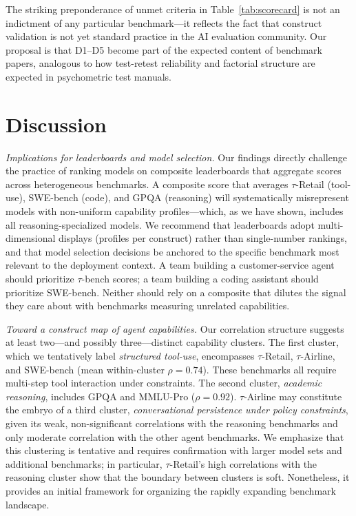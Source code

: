 \documentclass[sigconf]{acmart}
\begin{document}
The striking preponderance of unmet criteria in Table~\ref{tab:scorecard} is not an indictment of any particular benchmark---it reflects the fact that construct validation is not yet standard practice in the AI evaluation community. Our proposal is that D1--D5 become part of the expected content of benchmark papers, analogous to how test-retest reliability and factorial structure are expected in psychometric test manuals.

\section{Discussion}
\textit{Implications for leaderboards and model selection.} Our findings directly challenge the practice of ranking models on composite leaderboards that aggregate scores across heterogeneous benchmarks. A composite score that averages $\tau$-Retail (tool-use), SWE-bench (code), and GPQA (reasoning) will systematically misrepresent models with non-uniform capability profiles---which, as we have shown, includes all reasoning-specialized models. We recommend that leaderboards adopt multi-dimensional displays (profiles per construct) rather than single-number rankings, and that model selection decisions be anchored to the specific benchmark most relevant to the deployment context. A team building a customer-service agent should prioritize $\tau$-bench scores; a team building a coding assistant should prioritize SWE-bench. Neither should rely on a composite that dilutes the signal they care about with benchmarks measuring unrelated capabilities.

\textit{Toward a construct map of agent capabilities.} Our correlation structure suggests at least two---and possibly three---distinct capability clusters. The first cluster, which we tentatively label \emph{structured tool-use}, encompasses $\tau$-Retail, $\tau$-Airline, and SWE-bench (mean within-cluster $\rho = 0.74$). These benchmarks all require multi-step tool interaction under constraints. The second cluster, \emph{academic reasoning}, includes GPQA and MMLU-Pro ($\rho = 0.92$). $\tau$-Airline may constitute the embryo of a third cluster, \emph{conversational persistence under policy constraints}, given its weak, non-significant correlations with the reasoning benchmarks and only moderate correlation with the other agent benchmarks. We emphasize that this clustering is tentative and requires confirmation with larger model sets and additional benchmarks; in particular, $\tau$-Retail's high correlations with the reasoning cluster show that the boundary between clusters is soft. Nonetheless, it provides an initial framework for organizing the rapidly expanding benchmark landscape.
\end{document}
